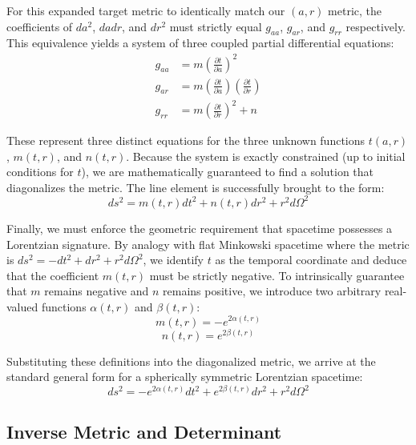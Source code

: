 \documentclass[11pt, a4paper]{report}
\begin{document}
For this expanded target metric to identically match our $(a,r)$ metric, the coefficients of $da^2$, $da dr$, and $dr^2$ must strictly equal $g_{aa}$, $g_{ar}$, and $g_{rr}$ respectively. This equivalence yields a system of three coupled partial differential equations:
\begin{align}
g_{aa} &= m \left( \frac{\partial t}{\partial a} \right)^2 \\
g_{ar} &= m \left( \frac{\partial t}{\partial a} \right) \left( \frac{\partial t}{\partial r} \right) \\
g_{rr} &= m \left( \frac{\partial t}{\partial r} \right)^2 + n
\end{align}

These represent three distinct equations for the three unknown functions $t(a,r)$, $m(t,r)$, and $n(t,r)$. Because the system is exactly constrained (up to initial conditions for $t$), we are mathematically guaranteed to find a solution that diagonalizes the metric. The line element is successfully brought to the form:
\begin{equation}
ds^{2}=m(t,r)dt^{2}+n(t,r)dr^{2}+r^{2}d\Omega^{2}
\end{equation}

Finally, we must enforce the geometric requirement that spacetime possesses a Lorentzian signature. By analogy with flat Minkowski spacetime where the metric is $ds^2 = -dt^2 + dr^2 + r^2 d\Omega^2$, we identify $t$ as the temporal coordinate and deduce that the coefficient $m(t,r)$ must be strictly negative. To intrinsically guarantee that $m$ remains negative and $n$ remains positive, we introduce two arbitrary real-valued functions $\alpha(t,r)$ and $\beta(t,r)$:
\begin{equation}
m(t,r) = -e^{2\alpha(t,r)}
\end{equation}
\begin{equation}
n(t,r) = e^{2\beta(t,r)}
\end{equation}

Substituting these definitions into the diagonalized metric, we arrive at the standard general form for a spherically symmetric Lorentzian spacetime:
\begin{equation}
ds^{2}=-e^{2\alpha(t,r)}dt^{2}+e^{2\beta(t,r)}dr^{2}+r^{2}d\Omega^{2}
\end{equation}


\subsection{Inverse Metric and Determinant}
\end{document}
